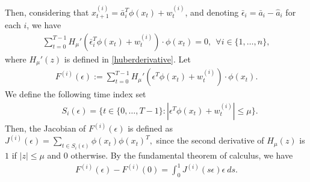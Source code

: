 \documentclass[letterpaper,10pt,conference]{ieeeconf}
\theoremstyle{plain} %
\theoremstyle{plain} %
\theoremstyle{plain} %
\theoremstyle{plain}
\begin{document}
 
 Then, considering that $x_{t+1}^{(i)} = \bar a_i^T \phi(x_t) +w_t^{(i)}$,  
and denoting $\bar \epsilon_i = \bar a_i - \hat a_i$ for each $i$, we have 
 \begin{align}\label{firstorder}
     \sum_{t=0}^{T-1}  H_{\mu}' ( \bar \epsilon_i^T \phi(x_t) + w_t^{(i)} )\cdot  \phi(x_t) = 0 , ~~ \forall i\in\{1,\dots,n\},
 \end{align}
 where $H_\mu'(z)$ is defined in \eqref{huberderivative}. 
 Let 
 \begin{align*}
     F^{(i)} (\epsilon) :=  \sum_{t=0}^{T-1}  H_{\mu}' (  \epsilon^T \phi(x_t) + w_t^{(i)} )\cdot  \phi(x_t).
 \end{align*}
 We define the following time index set  
\begin{align*}
   & S_i(\epsilon) = \{t\in\{0,\dots, T-1\}: |\epsilon^T \phi(x_t) + w_t^{(i)}|\le \mu\}. 
\end{align*}
Then, the Jacobian of $F^{(i)} (\epsilon)$ is 
defined as 
    $J^{(i)}(\epsilon) = \sum_{t\in S_i(\epsilon) }\phi(x_t)\phi(x_t)^T,$
since the second derivative of $H_\mu(z)$ is $1$ if $|z|\le \mu$ and $0$ otherwise. By the fundamental theorem of calculus, we have
\begin{align}\label{fund}
    F^{(i)} (\epsilon)-F^{(i)} (0) = \int_{0}^1   J^{(i)}(s \epsilon) \epsilon ~ds.
\end{align}
\end{document}

